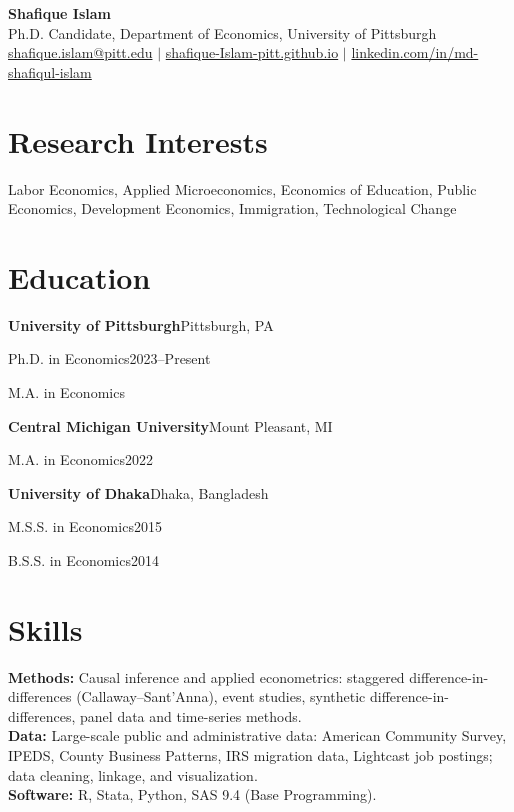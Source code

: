 \documentclass[11pt]{article}
\newcommand{\cvitem}[2]{%
  \textbf{#1}\hfill #2\par\nopagebreak
}
\newcommand{\cvline}[2]{%
  #1\hfill #2\par
}
\begin{document}
\begin{center}
{\LARGE \textbf{Shafique Islam}}\\[0.3em]
Ph.D. Candidate, Department of Economics, University of Pittsburgh\\[0.15em]
\href{mailto:shafique.islam@pitt.edu}{shafique.islam@pitt.edu}
\quad $\vert$ \quad
\href{https://shafique-Islam-pitt.github.io}{shafique-Islam-pitt.github.io}
\quad $\vert$ \quad
\href{https://www.linkedin.com/in/md-shafiqul-islam-09161aa7/}{linkedin.com/in/md-shafiqul-islam}
\end{center}

\section*{Research Interests}
Labor Economics, Applied Microeconomics, Economics of Education, Public Economics, Development
Economics, Immigration, Technological Change

\section*{Education}
\cvitem{University of Pittsburgh}{Pittsburgh, PA}
\cvline{Ph.D. in Economics}{2023--Present}
\cvline{M.A. in Economics}{}

\cvitem{Central Michigan University}{Mount Pleasant, MI}
\cvline{M.A. in Economics}{2022}

\cvitem{University of Dhaka}{Dhaka, Bangladesh}
\cvline{M.S.S. in Economics}{2015}
\cvline{B.S.S. in Economics}{2014}

\section*{Skills}
\textbf{Methods:} Causal inference and applied econometrics: staggered difference-in-differences
(Callaway--Sant'Anna), event studies, synthetic difference-in-differences, panel data and
time-series methods.\\
\textbf{Data:} Large-scale public and administrative data: American Community Survey, IPEDS,
County Business Patterns, IRS migration data, Lightcast job postings; data cleaning, linkage,
and visualization.\\
\textbf{Software:} R, Stata, Python, SAS 9.4 (Base Programming).
\end{document}
